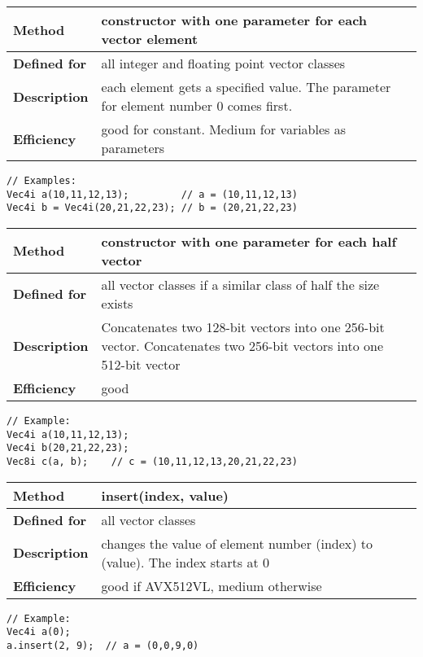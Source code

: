 \documentclass[vcl_manual.tex]{subfiles}
\begin{document}
\begin{tabular}{|p{25mm}|p{100mm}|}
\hline
\bfseries Method & constructor with one parameter for each vector element \\ \hline
\bfseries Defined for & all integer and floating point vector classes \\ \hline
\bfseries Description & each element gets a specified value. The parameter for element number 0 comes first. \\ \hline
\bfseries Efficiency & good for constant. Medium for variables as parameters \\ \hline
\end{tabular}
\begin{lstlisting}[frame=none]
// Examples:
Vec4i a(10,11,12,13);         // a = (10,11,12,13)
Vec4i b = Vec4i(20,21,22,23); // b = (20,21,22,23)
\end{lstlisting}

\begin{tabular}{|p{25mm}|p{100mm}|}
\hline
\bfseries Method & constructor with one parameter for each half vector \\ \hline
\bfseries Defined for & all vector classes if a similar class of half the size exists \\ \hline
\bfseries Description & Concatenates two 128-bit vectors into one 256-bit vector. \newline
Concatenates two 256-bit vectors into one 512-bit vector \\ \hline
\bfseries Efficiency & good \\ \hline
\end{tabular}
\begin{lstlisting}[frame=none]
// Example:
Vec4i a(10,11,12,13);
Vec4i b(20,21,22,23);
Vec8i c(a, b);    // c = (10,11,12,13,20,21,22,23)
\end{lstlisting}

\begin{tabular}{|p{25mm}|p{100mm}|}
\hline
\bfseries Method & insert(index, value) \\ \hline
\bfseries Defined for & all vector classes \\ \hline
\bfseries Description & changes the value of element number (index) to (value). The index starts at 0 \\ \hline
\bfseries Efficiency & good if AVX512VL, medium otherwise \\ \hline
\end{tabular}
\begin{lstlisting}[frame=none]
// Example:
Vec4i a(0);
a.insert(2, 9);  // a = (0,0,9,0)
\end{lstlisting}
\end{document}
